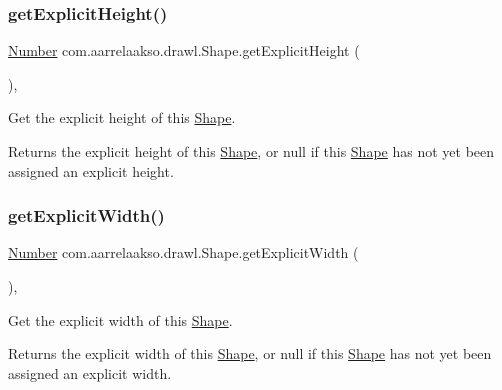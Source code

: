 \subsubsection{\texorpdfstring{get\+Explicit\+Height()}{getExplicitHeight()}}
{\footnotesize\ttfamily \hyperlink{interfacecom_1_1aarrelaakso_1_1drawl_1_1_number}{Number} com.\+aarrelaakso.\+drawl.\+Shape.\+get\+Explicit\+Height (\begin{DoxyParamCaption}{ }\end{DoxyParamCaption})\hspace{0.3cm}{\ttfamily [protected]}, {\ttfamily [inherited]}}



Get the explicit height of this \hyperlink{classcom_1_1aarrelaakso_1_1drawl_1_1_shape}{Shape}. 

\begin{DoxyReturn}{Returns}
the explicit height of this \hyperlink{classcom_1_1aarrelaakso_1_1drawl_1_1_shape}{Shape}, or {\ttfamily null} if this \hyperlink{classcom_1_1aarrelaakso_1_1drawl_1_1_shape}{Shape} has not yet been assigned an explicit height. 
\end{DoxyReturn}
\mbox{\label{classcom_1_1aarrelaakso_1_1drawl_1_1_shape_aca08f18bbe102a5cf6a77cb746d42875}} 
\subsubsection{\texorpdfstring{get\+Explicit\+Width()}{getExplicitWidth()}}
{\footnotesize\ttfamily \hyperlink{interfacecom_1_1aarrelaakso_1_1drawl_1_1_number}{Number} com.\+aarrelaakso.\+drawl.\+Shape.\+get\+Explicit\+Width (\begin{DoxyParamCaption}{ }\end{DoxyParamCaption})\hspace{0.3cm}{\ttfamily [protected]}, {\ttfamily [inherited]}}



Get the explicit width of this \hyperlink{classcom_1_1aarrelaakso_1_1drawl_1_1_shape}{Shape}. 

\begin{DoxyReturn}{Returns}
the explicit width of this \hyperlink{classcom_1_1aarrelaakso_1_1drawl_1_1_shape}{Shape}, or {\ttfamily null} if this \hyperlink{classcom_1_1aarrelaakso_1_1drawl_1_1_shape}{Shape} has not yet been assigned an explicit width. 
\end{DoxyReturn}
\mbox{\label{classcom_1_1aarrelaakso_1_1drawl_1_1_shape_aa1fbd5a290bc5d2df437f0bd79f30a89}} 
